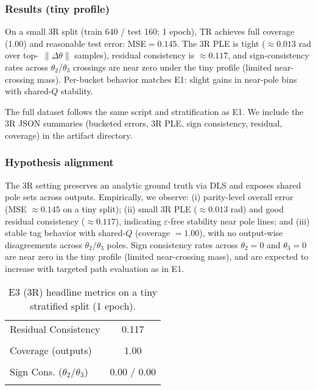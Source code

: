 \documentclass[11pt,twoside]{article}
\begin{document}
\subsubsection{Results (tiny profile)}

On a small 3R split (train 640 / test 160; 1 epoch), TR achieves full coverage (1.00) and reasonable test error: MSE$=0.145$. The 3R PLE is tight ($\approx0.013$ rad over top-\, $\|\Delta\theta\|$ samples), residual consistency is $\approx0.117$, and sign-consistency rates across $\theta_2$/$\theta_3$ crossings are near zero under the tiny profile (limited near-crossing mass). Per-bucket behavior matches E1: slight gains in near-pole bins with shared-$Q$ stability.



The full dataset follows the same script and stratification as E1. We include the 3R JSON summaries (bucketed errors, 3R PLE, sign consistency, residual, coverage) in the artifact directory.

\subsubsection{Hypothesis alignment}

The 3R setting preserves an analytic ground truth via DLS and exposes shared pole sets across outputs. Empirically, we observe: (i) parity-level overall error (MSE $\approx 0.145$ on a tiny split); (ii) small 3R PLE ($\approx 0.013$ rad) and good residual consistency ($\approx 0.117$), indicating $\varepsilon$-free stability near pole lines; and (iii) stable tag behavior with shared-$Q$ (coverage $=1.00$), with no output-wise disagreements across $\theta_2/\theta_3$ poles. Sign consistency rates across $\theta_2=0$ and $\theta_3=0$ are near zero in the tiny profile (limited near-crossing mass), and are expected to increase with targeted path evaluation as in E1.

\begin{table}[h]
  \centering
  \small
  \begin{tabular}{lc}
    Residual Consistency & 0.117 \\\\
    Coverage (outputs) & 1.00 \\\\
    Sign Cons. ($\theta_2$/$\theta_3$) & 0.00 / 0.00 \\\\
    \bottomrule
  \end{tabular}
\caption{E3 (3R) headline metrics on a tiny stratified split (1 epoch).}
\end{table}
\end{document}
